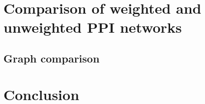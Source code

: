 


\section{Comparison of weighted and unweighted PPI networks}




\subsection{Graph comparison}


\section*{Conclusion}


